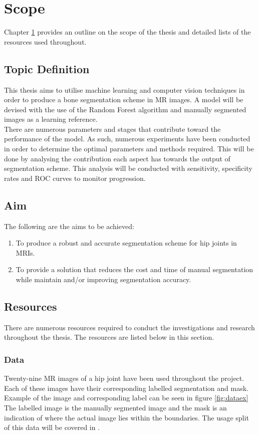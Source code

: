 \chapter{Scope}
\label{chpt: scope}
Chapter \ref{chpt: scope} provides an outline on the scope of the thesis and detailed lists of the resources used throughout. 
\section{Topic Definition}
This thesis aims to utilise machine learning and computer vision techniques in order to produce a bone segmentation scheme in MR images.
A model will be devised with the use of the Random Forest algorithm and manually segmented images as a learning reference. 
\\[1\baselineskip]
There are numerous parameters and stages that contribute toward the performance of the model. As such, numerous experiments have been conducted in order to determine the optimal parameters and methods required. This will be done by analysing the contribution each aspect has towards the output of segmentation scheme. This analysis will be conducted with sensitivity, specificity rates and ROC curves to monitor progression. 

\section{Aim}
The following are the aims to be achieved:
\begin{enumerate}
	\item To produce a robust and accurate segmentation scheme for hip joints in MRIs.
	\item To provide a solution that reduces the cost and time of manual segmentation while maintain and/or improving segmentation accuracy.
\end{enumerate}
\section{Resources}
There are numerous resources required to conduct the investigations and research throughout the thesis. The resources are listed below in this section. 
\subsection{Data}
Twenty-nine MR images of a hip joint have been used throughout the project. Each of these images have their corresponding labelled segmentation and mask. Example of the image and corresponding label can be seen in figure \ref{fig:dataex} The labelled image is the manually segmented image and the mask is an indication of where the actual image lies within the boundaries. The usage split of this data will be covered in .

